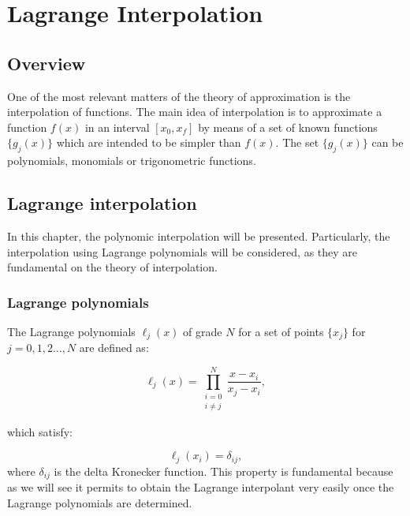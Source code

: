 
    
    \chapter{Lagrange Interpolation } \label{dev:Interpolation}
    \section{Overview}
    One of the most relevant matters of the theory of approximation is the interpolation of functions. The main idea of interpolation is to approximate a function $f(x)$ in an interval $[x_0,x_f]$ by means of a set of known functions $\{g_j(x)\}$ which are intended to be simpler than $f(x)$. The set $\{g_j(x)\}$ can be polynomials, monomials or trigonometric functions.
    
    
    
    \section{Lagrange interpolation}
    
    In this chapter, the polynomic interpolation will be presented. Particularly, the interpolation using Lagrange polynomials will be considered, as they are fundamental on the theory of interpolation.
    
    \subsection{Lagrange polynomials}
    
    The Lagrange polynomials $\ell_j(x)$ of grade $N$ for a set of points $\{x_j\}$ for $j=0,1,2\ldots,N$ are defined as:
    
    \begin{equation}
    	\ell_j(x) =  \prod_{\substack{i=0 \\ i\neq j}}^{N} \dfrac{x - x_i}{x_j - x_i},
    \end{equation}
    
    which satisfy: 
    
    \begin{equation}
    	\ell_j(x_i) = \delta_{ij}, \label{eq:Lagrange_kronecker}
    \end{equation}
    where $\delta_{ij}$ is the delta Kronecker function. This property is fundamental because as we will see it permits to obtain the Lagrange interpolant very easily once the Lagrange polynomials are determined. \\
    
